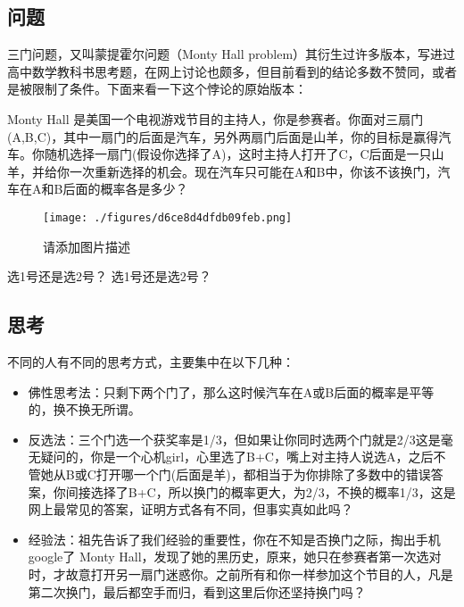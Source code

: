 
\begin{issues}
\issueDraft
\end{issues}

\subsection{问题}
三门问题，又叫蒙提霍尔问题（Monty Hall problem）其衍生过许多版本，写进过高中数学教科书思考题，在网上讨论也颇多，但目前看到的结论多数不赞同，或者是被限制了条件。下面来看一下这个悖论的原始版本：

Monty Hall 是美国一个电视游戏节目的主持人，你是参赛者。你面对三扇门(A,B,C)，其中一扇门的后面是汽车，另外两扇门后面是山羊，你的目标是赢得汽车。你随机选择一扇门(假设你选择了A)，这时主持人打开了C，C后面是一只山羊，并给你一次重新选择的机会。现在汽车只可能在A和B中，你该不该换门，汽车在A和B后面的概率各是多少？

\begin{figure}[ht]
\centering
\texttt{[image: ./figures/d6ce8d4dfdb09feb.png]}
\caption{请添加图片描述} \label{fig_MontyH_0}
\end{figure}

选1号还是选2号？
选1号还是选2号？

\subsection{思考}
不同的人有不同的思考方式，主要集中在以下几种：

\begin{itemize}
\item 佛性思考法：只剩下两个门了，那么这时候汽车在A或B后面的概率是平等的，换不换无所谓。

\item 反选法：三个门选一个获奖率是1/3，但如果让你同时选两个门就是2/3这是毫无疑问的，你是一个心机girl，心里选了B+C，嘴上对主持人说选A，之后不管她从B或C打开哪一个门(后面是羊)，都相当于为你排除了多数中的错误答案，你间接选择了B+C，所以换门的概率更大，为2/3，不换的概率1/3，这是网上最常见的答案，证明方式各有不同，但事实真如此吗？

\item 经验法：祖先告诉了我们经验的重要性，你在不知是否换门之际，掏出手机google了 Monty Hall，发现了她的黑历史，原来，她只在参赛者第一次选对时，才故意打开另一扇门迷惑你。之前所有和你一样参加这个节目的人，凡是第二次换门，最后都空手而归，看到这里后你还坚持换门吗？
\end{itemize}

